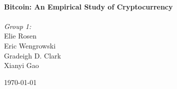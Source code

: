 \begin{titlepage}

\HRule \\[0.4cm]
{ \huge \bfseries Bitcoin: An Empirical Study of Cryptocurrency}\\[0.4cm] %
\HRule \\[1.5cm]
 


{ \Large \emph{Group 1:} \\Elie Rosen \\ Eric Wengrowski \\ Gradeigh D. Clark \\ Xianyi Gao \\}





{\large \today}\\[3cm] %


\vfill %

\end{titlepage}